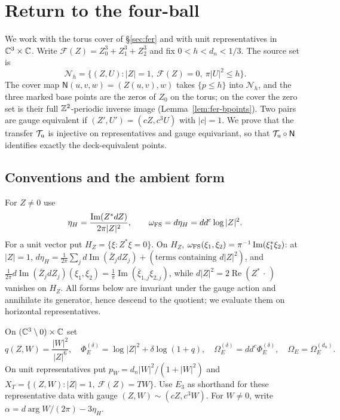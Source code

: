 \section{Return to the four-ball}\label{sec:rtc}

We work with the torus cover of \S\ref{sec:fer} and with unit representatives in $\mathbb{C}^3\times\mathbb{C}$.
Write $\mathcal F(Z)=Z_0^3+Z_1^3+Z_2^3$ and fix $0<h<d_n<1/3$. The source set is
\[
 \mathcal N_h=\{(Z,U):|Z|=1,\ \mathcal F(Z)=0,\ \pi|U|^2\le h\}.
\]
The cover map $\mathsf N(u,v,w)=(Z(u,v),w)$ takes $\{p\le h\}$ into $\mathcal N_h$, and the three marked base points are the
zeros of $Z_0$ on the torus; on the cover the zero set is their full $\mathbb{Z}^2$-periodic inverse image
(Lemma~\ref{lem:fer-bpoints}). Two pairs are gauge equivalent if $(Z',U')=(cZ,c^3U)$ with $|c|=1$. We
prove that the transfer $\mathcal T_{\rm u}$ is injective on representatives and gauge equivariant, so that
$\mathcal T_{\rm u}\circ\mathsf N$ identifies exactly the deck-equivalent points.

\subsection{Conventions and the ambient form}\label{sec:rtc-conventions}

For $Z\ne0$ use
\[
 \eta_H=\frac{\operatorname{Im}(Z^*dZ)}{2\pi|Z|^2},\qquad
 \omega_{\rm FS}=d\eta_H=dd^c\log|Z|^2.
\]
For a unit vector put $H_Z=\{\xi:Z^*\xi=0\}$.
On $H_Z$, $\omega_{\rm FS}(\xi_1,\xi_2)=\pi^{-1}\operatorname{Im}(\xi_1^*\xi_2)$: at $|Z|=1$,
$d\eta_H=\frac1{2\pi}\sum_jd\operatorname{Im}(\bar Z_jdZ_j)+(\text{terms containing }d|Z|^2)$, and
$\frac1{2\pi}d\operatorname{Im}(\bar Z_jdZ_j)(\xi_1,\xi_2)=\frac1\pi\operatorname{Im}(\bar\xi_{1,j}\xi_{2,j})$, while
$d|Z|^2=2\operatorname{Re}(Z^*\,\cdot\,)$ vanishes on $H_Z$. All forms below are invariant under the gauge action and annihilate its
generator, hence descend to the quotient; we evaluate them on horizontal representatives.

\begin{definition}\label{def:rtc-ambient}
On $(\mathbb{C}^3\setminus0)\times\mathbb{C}$ set
\[
 q(Z,W)=\frac{|W|^2}{|Z|^6},\quad
 \Phi_E^{(\delta)}=\log|Z|^2+\delta\log(1+q),\quad
 \Omega_E^{(\delta)}=dd^c\Phi_E^{(\delta)},\quad \Omega_E=\Omega_E^{(d_n)}.
\]
On unit representatives put $p_W=d_n|W|^2/(1+|W|^2)$ and
$X_T=\{(Z,W):|Z|=1,\ \mathcal F(Z)=TW\}$.
Use $E_3$ as shorthand for these representative data with gauge $(Z,W)\sim(cZ,c^3W)$.
For $W\ne0$, write $\alpha=d\arg W/(2\pi)-3\eta_H$.
\end{definition}


